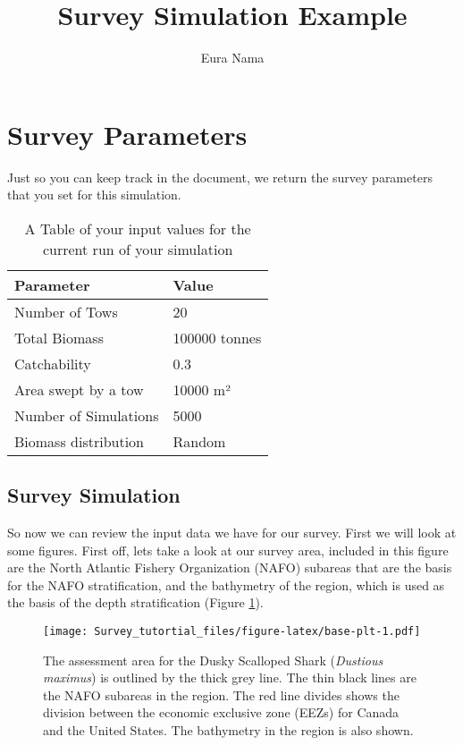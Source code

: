 \documentclass[
]{article}
\title{Survey Simulation Example}
\author{Eura Nama}
\date{}
\begin{document}
\maketitle

\hypertarget{survey-parameters}{%
\section{Survey Parameters}\label{survey-parameters}}

Just so you can keep track in the document, we return the survey parameters that you set for this simulation.

\begin{table}

\caption{\label{tab:paras}A Table of your input values for the current run of your simulation}
\centering
\begin{tabular}[t]{ll}
\toprule
Parameter & Value\\
\midrule
Number of Tows & 20\\
Total Biomass & 100000 tonnes\\
Catchability & 0.3\\
Area swept by a tow & 10000 m²\\
Number of Simulations & 5000\\
\addlinespace
Biomass distribution & Random\\
\bottomrule
\end{tabular}
\end{table}

\hypertarget{survey-simulation}{%
\subsection{Survey Simulation}\label{survey-simulation}}

So now we can review the input data we have for our survey. First we will look at some figures. First off, lets take a look at our survey area, included in this figure are the North Atlantic Fishery Organization (NAFO) subareas that are the basis for the NAFO stratification, and the bathymetry of the region, which is used as the basis of the depth stratification (Figure \ref{fig:base-plt}).

\begin{figure}
\centering
\texttt{[image: Survey\_tutortial\_files/figure-latex/base-plt-1.pdf]}
\caption{\label{fig:base-plt}The assessment area for the Dusky Scalloped Shark (\emph{Dustious maximus}) is outlined by the thick grey line. The thin black lines are the NAFO subareas in the region. The red line divides shows the division between the economic exclusive zone (EEZs) for Canada and the United States. The bathymetry in the region is also shown.}
\end{figure}
\end{document}
